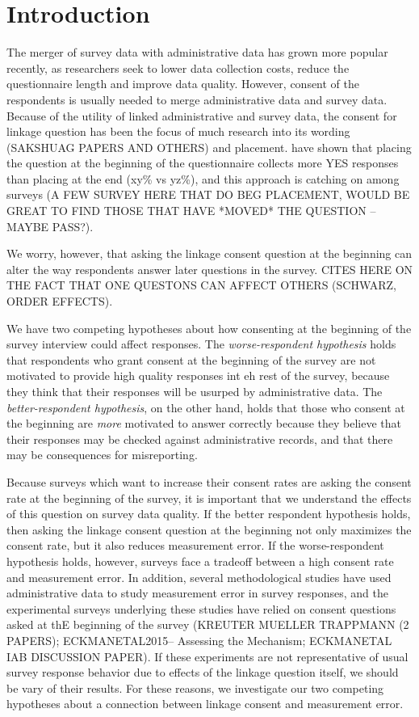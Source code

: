 \section{Introduction}

The merger of survey data with administrative data has grown more popular recently, as researchers seek to lower data collection costs, reduce the questionnaire length and improve data quality. However, consent of the respondents is usually needed to merge administrative data and survey data. Because of the utility of linked administrative and survey data, the consent for linkage question has been the focus of much research into its wording (SAKSHUAG PAPERS AND OTHERS) and placement. \cite{Sakshaugetal13} have shown that placing the question at the beginning of the questionnaire collects more YES responses than placing at the end (xy\% vs yz\%), and this approach is catching on among surveys (A FEW SURVEY HERE THAT DO BEG PLACEMENT, WOULD BE GREAT TO FIND THOSE THAT HAVE *MOVED* THE QUESTION -- MAYBE PASS?). 

We worry, however, that asking the linkage consent question at the beginning can alter the way respondents answer later questions in the survey. CITES HERE ON THE FACT THAT ONE QUESTONS CAN AFFECT OTHERS (SCHWARZ, ORDER EFFECTS). 

We have two competing hypotheses about how consenting at the beginning of the survey interview could affect responses. The \textit{worse-respondent hypothesis} holds that respondents who grant consent at the beginning of the survey are not motivated to provide high quality responses int eh rest of the survey, because they think that their responses will be usurped by administrative data. The \textit{better-respondent hypothesis}, on the other hand, holds that those who consent at the beginning are \textit{more} motivated to answer correctly because they believe that their responses may be checked against administrative records, and that there may be consequences for misreporting. 

Because surveys which want to increase their consent rates are asking the consent rate at the beginning of the survey, it is important that we understand the effects of this question on survey data quality. If the better respondent hypothesis holds, then asking the linkage consent question at the beginning not only maximizes the consent rate, but it also reduces measurement error. If the worse\--respondent hypothesis holds, however, surveys face a tradeoff between a high consent rate and  measurement error. In addition, several methodological studies have used administrative data to study measurement error in survey responses, and the experimental surveys underlying these studies have relied on consent questions asked at thE beginning of the survey (KREUTER MUELLER TRAPPMANN (2 PAPERS); ECKMANETAL2015-- Assessing the Mechanism; ECKMANETAL IAB DISCUSSION PAPER). If these experiments are not representative of usual survey response behavior due to effects of the linkage question itself, we should be vary of their results. For these reasons, we investigate our two competing hypotheses about a connection between linkage consent and measurement error.


